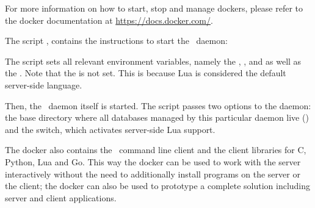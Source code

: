 For more information on how to start, stop and manage
dockers, please refer to the docker documentation at
\url{https://docs.docker.com/}.

The script , contains the
instructions to start the \nowdb\ daemon:


The script sets all relevant environment variables,
namely the ,
,
 and 
as well as the .
Note that the  is not set.
This is because Lua is considered the
default server-side language.

\clearpage
Then, the \nowdb\ daemon itself is started.
The script passes two options to the daemon:
the base directory where all databases
managed by this particular daemon live ()
and the  switch, which activates
server-side Lua support.

The docker also contains the \nowdb\ command line client
and the client libraries for C, Python, Lua and Go.
This way the docker can be used to work with the server
interactively without the need to additionally install
programs on the server or the client; the docker can
also be used to prototype a complete solution including
server and client applications.
